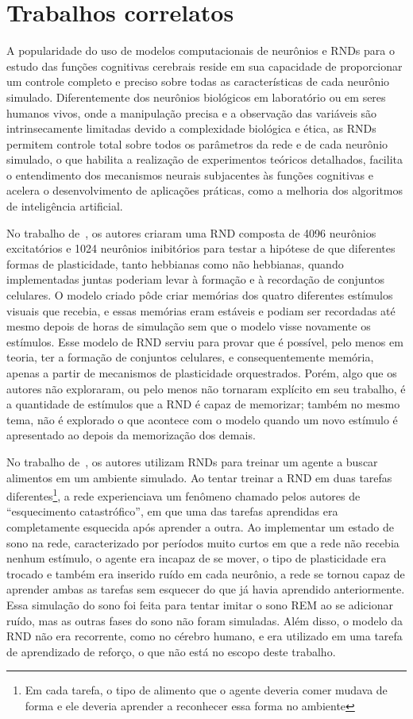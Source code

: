 \section{Trabalhos correlatos}

A popularidade do uso de modelos computacionais de neurônios e RNDs para o estudo das funções cognitivas cerebrais reside em sua
capacidade de proporcionar um controle completo e preciso sobre todas as características de cada neurônio simulado. Diferentemente
dos neurônios biológicos em laboratório ou em seres humanos vivos, onde a manipulação precisa e a observação das variáveis são
intrinsecamente limitadas devido a complexidade biológica e ética, as RNDs permitem controle total sobre todos os parâmetros da
rede e de cada neurônio simulado, o que habilita a realização de experimentos teóricos detalhados, facilita o entendimento dos
mecanismos neurais subjacentes às funções cognitivas e acelera o desenvolvimento de aplicações práticas, como a melhoria dos
algoritmos de inteligência artificial. 

No trabalho de~\cite{zenkeDiverse2015}, os autores criaram uma RND composta de 4096 neurônios excitatórios e 1024 neurônios inibitórios para
testar a hipótese de que diferentes formas de plasticidade, tanto hebbianas como não hebbianas, quando implementadas juntas
poderiam levar à formação e à recordação de conjuntos celulares. O modelo criado pôde criar memórias dos quatro diferentes
estímulos visuais que recebia, e essas memórias eram estáveis e podiam ser recordadas até mesmo depois de horas de simulação sem
que o modelo visse novamente os estímulos. Esse modelo de RND serviu para provar que é possível, pelo menos em teoria, ter a
formação de conjuntos celulares, e consequentemente memória, apenas a partir de mecanismos de plasticidade orquestrados. Porém,
algo que os autores não exploraram, ou pelo menos não tornaram explícito em seu trabalho, é a quantidade de estímulos que a RND é
capaz de memorizar; também no mesmo tema, não é explorado o que acontece com o modelo quando um novo estímulo é apresentado ao
depois da memorização dos demais.

No trabalho de~\cite{goldenSleep2022}, os autores utilizam RNDs para treinar um agente a buscar alimentos em um ambiente simulado.
Ao tentar treinar a RND em duas tarefas diferentes\footnote{Em cada tarefa, o tipo de alimento que o agente deveria comer mudava
de forma e ele deveria aprender a reconhecer essa forma no ambiente}, a rede experienciava um fenômeno chamado pelos autores de
``esquecimento catastrófico'', em que uma das tarefas aprendidas era completamente esquecida após aprender a outra. Ao implementar
um estado de sono na rede, caracterizado por períodos muito curtos em que a rede não recebia nenhum estímulo, o agente era incapaz
de se mover, o tipo de plasticidade era trocado e também era inserido ruído em cada neurônio, a rede se tornou capaz de aprender
ambas as tarefas sem esquecer do que já havia aprendido anteriormente. Essa simulação do sono foi feita para tentar imitar o sono
REM ao se adicionar ruído, mas as outras fases do sono não foram simuladas. Além disso, o modelo da RND não era recorrente, como
no cérebro humano, e era utilizado em uma tarefa de aprendizado de reforço, o que não está no escopo deste trabalho.

